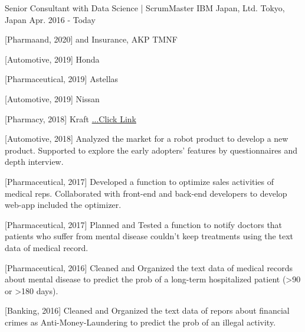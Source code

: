 

\begin{cventries}

  \cventry
    {Senior Consultant with Data Science | ScrumMaster} %
    {IBM Japan, Ltd.} %
    {Tokyo, Japan} %
    {Apr. 2016 - Today} %
    {
      \begin{cvitems} %
        \item {[Pharmaand, 2020] and Insurance, AKP TMNF}
        \item {[Automotive, 2019] Honda}
        \item {[Pharmaceutical, 2019] Astellas}
        \item {[Automotive, 2019] Nissan}
        \item {[Pharmacy, 2018] Kraft \href{https://www.ibm.com/think/jp-ja/business/sakura-ai/}{...Click Link}}
        \item {[Automotive, 2018] Analyzed the market for a robot product to develop a new product. Supported to explore the early adopters' features by questionnaires and depth interview.}
        \item {[Pharmaceutical, 2017] Developed a function to optimize sales activities of medical reps. Collaborated with front-end and back-end developers to develop web-app included the optimizer.}
        \item {[Pharmaceutical, 2017] Planned and Tested a function to notify doctors that patients who suffer from mental disease couldn't keep treatments using the text data of medical record.}
        \item {[Pharmaceutical, 2016] Cleaned and Organized the text data of medical records about mental disease to predict the prob of a long-term hospitalized patient (>90 or >180 days).}
        \item {[Banking, 2016] Cleaned and Organized the text data of repors about financial crimes as Anti-Money-Laundering to predict the prob of an illegal activity.}
      \end{cvitems}
    }
\end{cventries}
